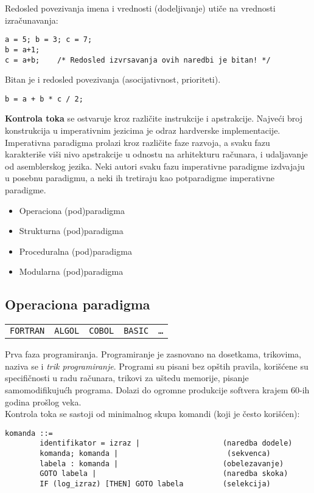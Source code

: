 \documentclass[../main.tex]{subfiles}
\begin{document}
Redosled povezivanja imena i vrednosti (dodeljivanje) utiče na vrednosti izračunavanja:
\begin{Verbatim}
a = 5; b = 3; c = 7;
b = a+1;
c = a+b;	/* Redosled izvrsavanja ovih naredbi je bitan! */
\end{Verbatim}

Bitan je i redosled povezivanja (asocijativnost, prioriteti).
\begin{Verbatim}
b = a + b * c / 2;
\end{Verbatim}

{\bf Kontrola toka} se ostvaruje kroz različite instrukcije i apstrakcije. Najveći broj konstrukcija u imperativnim jezicima je odraz hardverske implementacije. Imperativna paradigma prolazi kroz različite faze razvoja, a svaku fazu karakteriše viši nivo apstrakcije u odnostu na arhitekturu računara, i udaljavanje od asemblerskog jezika. Neki autori svaku fazu imperativne paradigme izdvajaju u posebnu paradigmu, a neki ih tretiraju kao potparadigme imperativne paradigme.
\begin{itemize}
\item Operaciona (pod)paradigma
\item Strukturna (pod)paradigma
\item Proceduralna (pod)paradigma
\item Modularna (pod)paradigma
\end{itemize}

\subsection{Operaciona paradigma}

\begin{tabularx}{\textwidth}{XXXXX}
\texttt{FORTRAN} & \texttt{ALGOL} & \texttt{COBOL} & \texttt{BASIC} & \texttt{\ldots}
\end{tabularx}

Prva faza programiranja. Programiranje je zasnovano na dosetkama, trikovima, naziva se i {\it trik programiranje}. Programi su pisani bez opštih pravila, korišćene su specifičnosti u radu računara, trikovi za uštedu memorije, pisanje samomodifikujućh programa. Dolazi do ogromne produkcije softvera krajem 60-ih godina prošlog veka. 
\\
Kontrola toka se sastoji od minimalnog skupa komandi (koji je često korišćen):
\begin{Verbatim}
komanda ::=
        identifikator = izraz |                   (naredba dodele)
        komanda; komanda |                         (sekvenca)
        labela : komanda |                        (obelezavanje)
        GOTO labela |                             (naredba skoka)
        IF (log_izraz) [THEN] GOTO labela         (selekcija)
\end{Verbatim}
\end{document}
